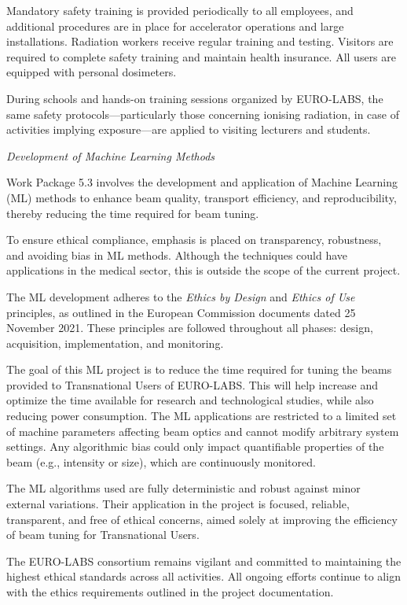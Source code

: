 Mandatory safety training is provided periodically to all employees, and additional procedures are in place for accelerator operations and large installations. Radiation workers receive regular training and testing. Visitors are required to complete safety training and maintain health insurance. All users are equipped with personal dosimeters.

During schools and hands-on training sessions organized by EURO-LABS, the same safety protocols—particularly those concerning ionising radiation, in case of activities implying exposure—are applied to visiting lecturers and students.

{\it Development of Machine Learning Methods}

Work Package 5.3 involves the development and application of Machine Learning (ML) methods to enhance beam quality, transport efficiency, and reproducibility, thereby reducing the time required for beam tuning.

To ensure ethical compliance, emphasis is placed on transparency, robustness, and avoiding bias in ML methods. Although the techniques could have applications in the medical sector, this is outside the scope of the current project.

The ML development adheres to the \textit{Ethics by Design} and \textit{Ethics of Use} principles, as outlined in the European Commission documents dated 25 November 2021. These principles are followed throughout all phases: design, acquisition, implementation, and monitoring.

The goal of this ML project is to reduce the time required for tuning the beams provided to Transnational Users of EURO-LABS. This will help increase and optimize the time available for research and technological studies, while also reducing power consumption.
The ML applications are restricted to a limited set of machine parameters affecting beam optics and cannot modify arbitrary system settings. Any algorithmic bias could only impact quantifiable properties of the beam (e.g., intensity or size), which are continuously monitored.

The ML algorithms used are fully deterministic and robust against minor external variations. Their application in the project is focused, reliable, transparent, and free of ethical concerns, aimed solely at improving the efficiency of beam tuning for Transnational Users. 

The EURO-LABS consortium remains vigilant and committed to maintaining the highest ethical standards across all activities. All ongoing efforts continue to align with the ethics requirements outlined in the project documentation.


